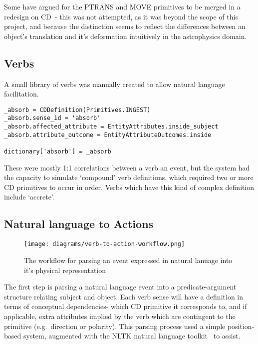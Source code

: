 \documentclass[dissertation.tex]{subfiles}
\begin{document}
    Some have argued for the PTRANS and MOVE primitives to be merged in a redesign on CD~\cite{macbethimage}- this was not attempted, as it was beyond the scope of this project, and because the distinction seems to reflect the differences between an object's translation and it's deformation intuitively in the astrophysics domain.

    \subsection{Verbs}
    A small library of verbs was manually created to allow natural language facilitation.
    
    \begin{lstlisting}[caption={The verb `absorb' being added to the dictionary}]
_absorb = CDDefinition(Primitives.INGEST)
_absorb.sense_id = 'absorb'
_absorb.affected_attribute = EntityAttributes.inside_subject
_absorb.attribute_outcome = EntityAttributeOutcomes.inside

dictionary['absorb'] = _absorb
    \end{lstlisting}
    
    These were mostly 1:1 correlations between a verb an event, but the system had the capacity to simulate `compound' verb definitions, which required two or more CD primitives to occur in order. Verbs which have this kind of complex definition include `accrete'.

    \subsection{Natural language to Actions}

    \begin{figure}[h]
        \begin{center}
            \texttt{[image: diagrams/verb-to-action-workflow.png]}
        \end{center}
        \caption{The workflow for parsing an event expressed in natural lanuage into it's physical representation}
    \end{figure}

    The first step is parsing a natural language event into a predicate-argument structure relating subject and object. Each verb sense will have a definition in terms of conceptual dependencies- which CD primitive it corresponds to, and if applicable, extra attributes implied by the verb which are contingent to the primitive (e.g.~direction or polarity). This parsing process used a simple position-based system, augmented with the NLTK natural language toolkit~\cite{bird2009nltk} to assist.
    
\end{document}
